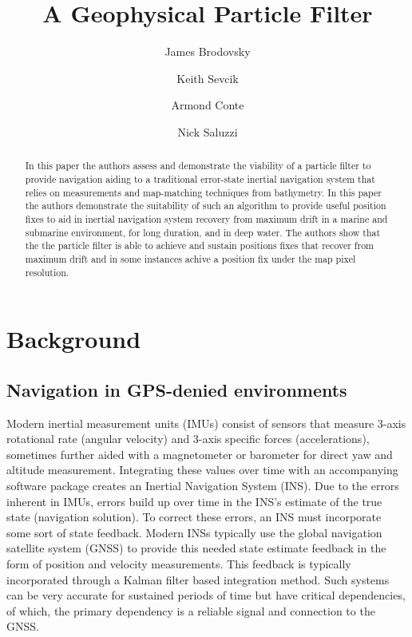 \documentclass[]{article}
\title{A Geophysical Particle Filter}
\author{
	James Brodovsky\\
	\and
	Keith Sevcik\\
	\and
	Armond Conte\\
	\and
	Nick Saluzzi\\
}
\begin{document}
\maketitle

\begin{abstract}
In this paper the authors assess and demonstrate the viability of a particle filter to provide navigation aiding to a traditional error-state inertial navigation system that relies on measurements and map-matching techniques from bathymetry. In this paper the authors demonstrate the suitability of such an algorithm to provide useful position fixes to aid in inertial navigation system recovery from maximum drift in a marine and submarine environment, for long duration, and in deep water. The authors show that the the particle filter is able to achieve and sustain positions fixes that recover from maximum drift and in some instances achive a position fix under the map pixel resolution.
\end{abstract}

\section{Background}
\subsection{Navigation in GPS-denied environments}
Modern inertial measurement units (IMUs) consist of sensors that measure 3-axis rotational rate (angular velocity) and 3-axis specific forces (accelerations), sometimes further aided with a magnetometer or barometer for direct yaw and altitude measurement. Integrating these values over time with an accompanying software package creates an Inertial Navigation System (INS)\cite{groves_ch1}. Due to the errors inherent in IMUs, errors build up over time in the INS's estimate of the true state (navigation solution). To correct these errors, an INS must incorporate some sort of state feedback. Modern INSs typically use the global navigation satellite system (GNSS) to provide this needed state estimate feedback in the form of position and velocity measurements. This feedback is typically incorporated through a Kalman filter based integration method\cite{groves_ch14}. Such systems can be very accurate for sustained periods of time but have critical dependencies, of which, the primary dependency is a reliable signal and connection to the GNSS\@. 
\end{document}
